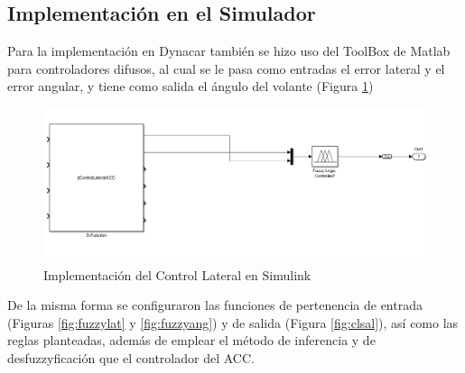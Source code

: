 \subsection{Implementación en el Simulador}

Para la implementación en Dynacar también se hizo uso del ToolBox de Matlab para controladores difusos, al cual se le pasa como entradas el error lateral y el error angular, y tiene como salida el ángulo del volante (Figura \ref{fig:cldyna})


\begin{figure}[!h]
	\centering
		\includegraphics[scale=0.3]{Imagenes/cldyna}
		\caption{Implementación del Control Lateral en Simulink}
		\label{fig:cldyna}
\end{figure}	 

\par De la misma forma se configuraron las funciones de pertenencia de entrada (Figuras \ref{fig:fuzzylat} y \ref{fig:fuzzyang}) y de salida (Figura \ref{fig:clsal}), así como las reglas planteadas, además de emplear el método de inferencia y de desfuzzyficación que el controlador del ACC.


